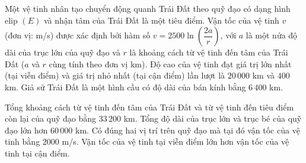 \begin{ex}
Một vệ tinh nhân tạo chuyển động quanh Trái Đất theo quỹ đạo có dạng hình elip $(E)$ và nhận tâm của Trái Đất là một tiêu điểm. Vận tốc của vệ tinh $v$ (đơn vị: m/s) được xác định bởi hàm số $v=2500\ln\left(\dfrac{2a}{r}\right)$, với $a$ là một nửa độ dài của trục lớn của quỹ đạo và $r$ là khoảng cách từ vệ tinh đến tâm của Trái Đất ($a$ và $r$ cùng tính theo đơn vị km). Độ cao của vệ tinh đạt giá trị lớn nhất (tại viễn điểm) và giá trị nhỏ nhất (tại cận điểm) lần lượt là $20\,000$ km và $400$ km. Giả sử Trái Đất là một hình cầu có độ dài của bán kính bằng $6\,400$ km.
\begin{center}
\end{center}
\choiceTF
{\True Tổng khoảng cách từ vệ tinh đến tâm của Trái Đất và từ vệ tinh đến tiêu điểm còn lại của quỹ đạo bằng $33\,200$ km.}
{Tổng độ dài của trục lớn và trục bé của quỹ đạo lớn hơn $60\,000$ km.}
{\True Có đúng hai vị trí trên quỹ đạo mà tại đó vận tốc của vệ tinh bằng $2000$ m/s.}
{Vận tốc của vệ tinh tại viễn điểm lớn hơn vận tốc của vệ tinh tại cận điểm.}
\end{ex}
